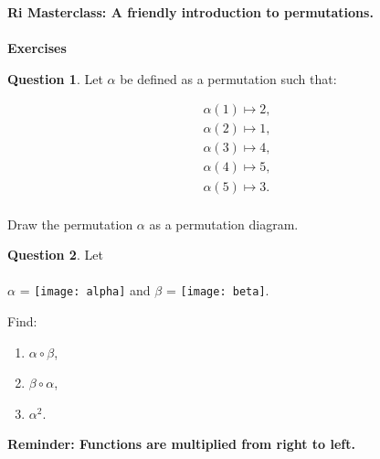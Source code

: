 \documentclass[a4paper,12pt]{article}
\date{Version of \today}
\theoremstyle{definition}
\newtheorem{question}{Question}%
\theoremstyle{remark}
\begin{document}
\renewcommand{\headrulewidth}{0pt}
\fancyhead{}
\fancyfoot{}
\cfoot{}

\begin{center} \textbf{{\large Ri Masterclass: A friendly introduction to permutations. }} \\
{\hspace{1em}} \\
\textbf{Exercises}
\end{center}


\begin{question}
 Let $\alpha$ be defined as a permutation such that:

 \begin{align*}
   \label{eq:1}
   \alpha(1) \mapsto 2, \\
   \alpha(2) \mapsto 1, \\
   \alpha(3) \mapsto 4, \\ 
   \alpha(4) \mapsto 5, \\
   \alpha(5) \mapsto 3. \\
 \end{align*}

Draw the permutation $\alpha$ as a permutation diagram.
\end{question}


%
\begin{question}
Let \\
\textcolor{white}{.}  \\

$\alpha$ = \texttt{[image: alpha]} \qquad and \qquad $\beta$ = \texttt{[image: beta]}. 

\vspace{1cm}


Find:
\begin{enumerate}
\item $\alpha \circ \beta$,
\item $\beta \circ \alpha$,
\item $\alpha^2$.
\end{enumerate}
\textbf{Reminder: Functions are multiplied from right to left.}
\vspace{0.5em}
\end{question}
\end{document}
